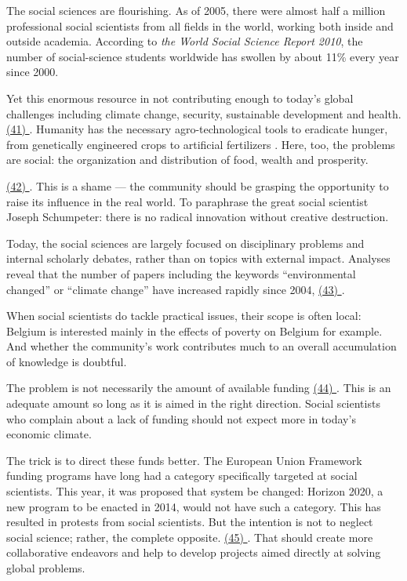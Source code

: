 
\qquad The social sciences are flourishing. As of 2005, there were almost half a million professional social scientists from all fields in the world, working both inside and outside academia. According to \emph{the World Social Science Report 2010}, the number of social-science students worldwide has swollen by about 11\% every year since 2000.

\qquad Yet this enormous resource in not contributing enough to today's global challenges including climate change, security, sustainable development and health. \ul{(41) \quad\quad\quad\quad\quad\quad\quad\quad\quad\quad\quad\quad}. Humanity has the necessary agro-technological tools to eradicate hunger, from genetically engineered crops to artificial fertilizers . Here, too, the problems are social: the organization and distribution of food, wealth and prosperity.

\qquad \ul{(42) \quad\quad\quad\quad\quad\quad\quad\quad\quad\quad}. This is a shame --- the community should be grasping the opportunity to raise its influence in the real world. To paraphrase the great social scientist Joseph Schumpeter: there is no radical innovation without creative destruction.

\qquad Today, the social sciences are largely focused on disciplinary problems and internal scholarly debates, rather than on topics with external impact. Analyses reveal that the number of papers including the keywords ``environmental changed'' or ``climate change'' have increased rapidly since 2004, \ul{(43) \quad\quad\quad\quad\quad\quad\quad\quad\quad\quad\quad\quad}.

\qquad When social scientists do tackle practical issues, their scope is often local: Belgium is interested mainly in the effects of poverty on Belgium for example. And whether the community's work contributes much to an overall accumulation of knowledge is doubtful.

\qquad The problem is not necessarily the amount of available funding \ul{(44) \quad\quad\quad\quad\quad\quad\quad\quad\quad\quad\quad\quad}. This is an adequate amount so long as it is aimed in the right direction. Social scientists who complain about a lack of funding should not expect more in today's economic climate.

\qquad The trick is to direct these funds better. The European Union Framework funding programs have long had a category specifically targeted at social scientists. This year, it was proposed that system be changed: Horizon 2020, a new program to be enacted in 2014, would not have such a category. This has resulted in protests from social scientists. But the intention is not to neglect social science; rather, the complete opposite. \ul{(45) \quad\quad\quad\quad\quad\quad\quad\quad\quad\quad\quad\quad}. That should create more collaborative endeavors and help to develop projects aimed directly at solving global problems.

